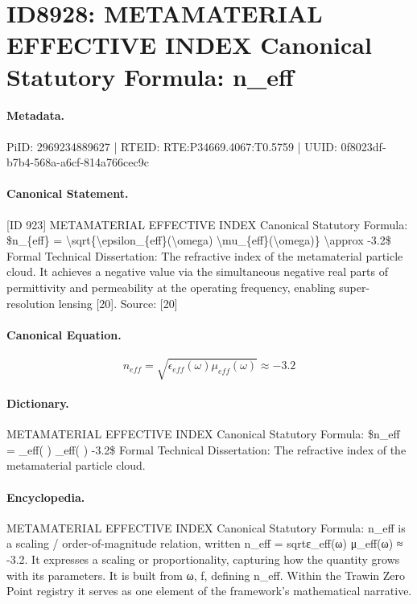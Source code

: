 \section*{ID8928: METAMATERIAL EFFECTIVE INDEX Canonical Statutory Formula: n\_eff}
\paragraph{Metadata.}
PiID: 2969234889627 | RTEID: RTE:P34669.4067:T0.5759 | UUID: 0f8023df-b7b4-568a-a6cf-814a766cec9c

\paragraph{Canonical Statement.}
[ID 923] METAMATERIAL EFFECTIVE INDEX Canonical Statutory Formula: \$n\_\{eff\} = \textbackslash{}sqrt\{\textbackslash{}epsilon\_\{eff\}(\textbackslash{}omega) \textbackslash{}mu\_\{eff\}(\textbackslash{}omega)\} \textbackslash{}approx -3.2\$ Formal Technical Dissertation: The refractive index of the metamaterial particle cloud. It achieves a negative value via the simultaneous negative real parts of permittivity and permeability at the operating frequency, enabling super-resolution lensing [20]. Source: [20]

\paragraph{Canonical Equation.}
\[
n_{eff} = \sqrt{\epsilon_{eff}(\omega) \mu_{eff}(\omega)} \approx -3.2
\]

\paragraph{Dictionary.}
METAMATERIAL EFFECTIVE INDEX Canonical Statutory Formula: \$n\_eff = \_eff( ) \_eff( ) -3.2\$ Formal Technical Dissertation: The refractive index of the metamaterial particle cloud.

\paragraph{Encyclopedia.}
METAMATERIAL EFFECTIVE INDEX Canonical Statutory Formula: n\_eff is a scaling / order-of-magnitude relation, written n\_eff = sqrtε\_eff(ω) μ\_eff(ω) ≈ -3.2. It expresses a scaling or proportionality, capturing how the quantity grows with its parameters. It is built from ω, f, defining n\_eff. Within the Trawin Zero Point registry it serves as one element of the framework's mathematical narrative.

